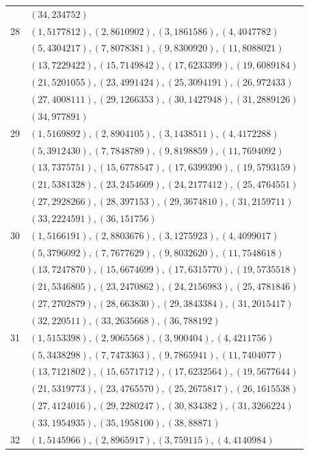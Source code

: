 \begin{longtable}{r p{}}
 & $(34,234752)$ \\[2pt]
28 & $(1,5177812), (2,8610902), (3,1861586), (4,4047782)$ \\[2pt]
 & $(5,4304217), (7,8078381), (9,8300920), (11,8088021)$ \\[2pt]
 & $(13,7229422), (15,7149842), (17,6233399), (19,6089184)$ \\[2pt]
 & $(21,5201055), (23,4991424), (25,3094191), (26,972433)$ \\[2pt]
 & $(27,4008111), (29,1266353), (30,1427948), (31,2889126)$ \\[2pt]
 & $(34,977891)$ \\[2pt]
29 & $(1,5169892), (2,8904105), (3,1438511), (4,4172288)$ \\[2pt]
 & $(5,3912430), (7,7848789), (9,8198859), (11,7694092)$ \\[2pt]
 & $(13,7375751), (15,6778547), (17,6399390), (19,5793159)$ \\[2pt]
 & $(21,5381328), (23,2454609), (24,2177412), (25,4764551)$ \\[2pt]
 & $(27,2928266), (28,397153), (29,3674810), (31,2159711)$ \\[2pt]
 & $(33,2224591), (36,151756)$ \\[2pt]
30 & $(1,5166191), (2,8803676), (3,1275923), (4,4099017)$ \\[2pt]
 & $(5,3796092), (7,7677629), (9,8032620), (11,7548618)$ \\[2pt]
 & $(13,7247870), (15,6674699), (17,6315770), (19,5735518)$ \\[2pt]
 & $(21,5346805), (23,2470862), (24,2156983), (25,4781846)$ \\[2pt]
 & $(27,2702879), (28,663830), (29,3843384), (31,2015417)$ \\[2pt]
 & $(32,220511), (33,2635668), (36,788192)$ \\[2pt]
31 & $(1,5153398), (2,9065568), (3,900404), (4,4211756)$ \\[2pt]
 & $(5,3438298), (7,7473363), (9,7865941), (11,7404077)$ \\[2pt]
 & $(13,7121802), (15,6571712), (17,6232564), (19,5677644)$ \\[2pt]
 & $(21,5319773), (23,4765570), (25,2675817), (26,1615538)$ \\[2pt]
 & $(27,4124016), (29,2280247), (30,834382), (31,3266224)$ \\[2pt]
 & $(33,1954935), (35,1958100), (38,88871)$ \\[2pt]
32 & $(1,5145966), (2,8965917), (3,759115), (4,4140984)$ \\[2pt]

\end{longtable}
